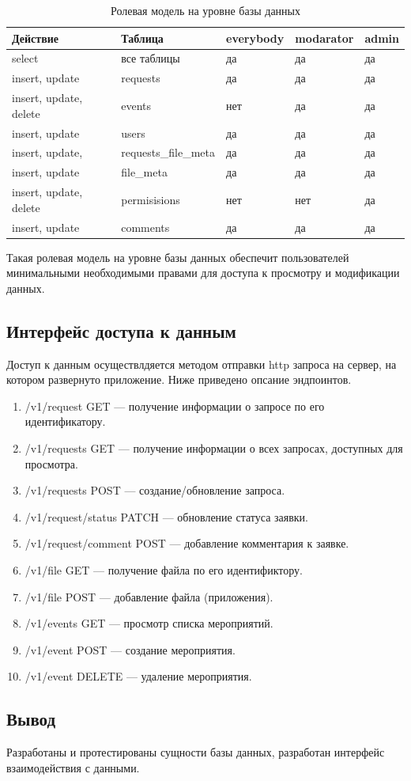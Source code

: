 \begin{table}[ht!]
	\centering
	\caption{\label{tab:roles} Ролевая модель на уровне базы данных}
	\begin{tabular}{|l|l|l|l|l|}
		\hline
		\textbf{Действие} & \textbf{Таблица} & \textbf{everybody} & \textbf{modarator} &  \textbf{admin}\\
		\hline
		select & все таблицы & да & да & да \\
		\hline
		insert, update & requests & да & да & да \\
		\hline
		insert, update, delete & events & нет & да & да \\
		\hline
		insert, update & users & да & да & да \\
		\hline
		insert, update, & requests{\_}file{\_}meta & да & да & да \\
		\hline
		insert, update & file{\_}meta & да & да & да \\
		\hline
		insert, update, delete & permisisions & нет & нет & да \\
		\hline
		insert, update & comments & да & да & да \\
		\hline

	\end{tabular}
\end{table}

Такая ролевая модель на уровне базы данных обеспечит пользователей минимальными необходимыми правами для доступа к просмотру и модификации данных.

\subsection{Интерфейс доступа к данным}

Доступ к данным осуществлдяется методом отправки http запроса на сервер, на котором развернуто приложение. Ниже приведено опсание эндпоинтов.

\begin{enumerate}
	\item /v1/request GET --- получение информации о запросе по его идентификатору. 
	\item /v1/requests GET --- получение информации о всех запросах, доступных для просмотра.
	\item /v1/requests POST --- создание/обновление запроса.
	\item /v1/request/status PATCH --- обновление статуса заявки.
	\item /v1/request/comment POST --- добавление комментария к заявке.
	\item /v1/file GET --- получение файла по его идентификтору.
	\item /v1/file POST --- добавление файла (приложения).
	\item /v1/events GET --- просмотр списка мероприятий.
	\item /v1/event POST --- создание мероприятия.
	\item /v1/event DELETE --- удаление мероприятия.
\end{enumerate}

\subsection{Вывод}

Разработаны и протестированы сущности базы данных, разработан интерфейс взаимодействия с данными.

\pagebreak